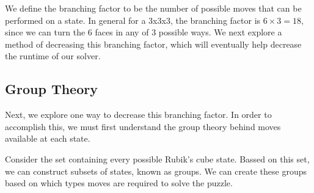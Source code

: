 \documentclass{article}
\begin{document}




We define the branching factor to be the number of possible moves that can be performed on a state. In general for a 3x3x3, the branching factor is $6 \times 3 = 18$, since we can turn the $6$ faces in any of $3$ possible ways. We next explore a method of decreasing this branching factor, which will eventually help decrease the runtime of our solver.

\subsection{Group Theory}

Next, we explore one way to decrease this branching factor. In order to accomplish this, we must first understand the group theory behind moves available at each state.

Consider the set containing every possible Rubik's cube state. Bassed on this set, we can construct subsets of states, known as groups. We can create these groups based on which types moves are required to solve the puzzle.
\end{document}
